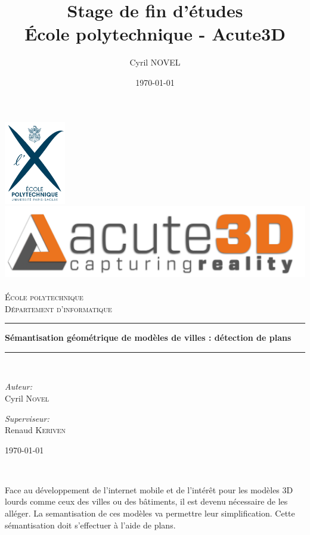 ﻿\documentclass[12pt, twoside]{article}
\title{Stage de fin d'études\\
\large{École polytechnique - Acute3D}}
\author{Cyril NOVEL}
\date{\today}
\begin{document}
\begin{titlepage}
\begin{center}
\includegraphics[width=0.20\textwidth]{LogoX.jpg}~\\[0.5cm]
\includegraphics[height=0.12\textwidth]{LogoA3D.jpg}~\\[1cm]

\textsc{\LARGE École polytechnique}\\[0.5cm]

\textsc{\Large Département d'informatique}\\[1.5cm]

\rule{\textwidth}{.4pt}
{ \huge \bfseries Sémantisation géométrique de modèles de villes : détection de plans \\[0.4cm] }

\rule{\textwidth}{.4pt}\\[1.5cm]

\begin{minipage}{0.4\textwidth}
\begin{flushleft} \large
\emph{Auteur:}\\
Cyril \textsc{Novel}
\end{flushleft}
\end{minipage}
\begin{minipage}{0.4\textwidth}
\begin{flushright} \large
\emph{Superviseur:} \\
Renaud \textsc{Keriven}
\end{flushright}
\end{minipage}

\vfill
{\large \today}
\end{center}
\end{titlepage}

\newpage
\begin{abstract}
\end{abstract}~\\[5cm]
Face au développement de l'internet mobile et de l'intérêt pour les modèles 3D lourds comme ceux des villes ou des bâtiments, il est devenu nécessaire de les alléger. La semantisation de ces modèles va permettre leur simplification. Cette sémantisation doit s'effectuer à l'aide de plans.
\end{document}

